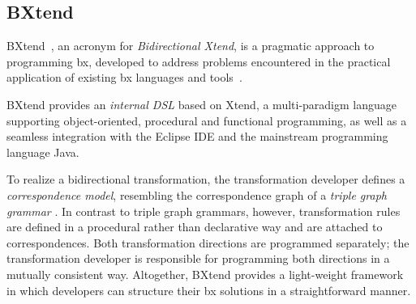\subsection{BXtend}
\label{sec:BXtend}


BXtend~\cite{MODELSWARD2018-Buchmann}, an acronym for \emph{Bidirectional Xtend}, is a pragmatic approach to programming bx, developed to address problems encountered in the practical application of existing bx languages and tools~\cite{DBLP:conf/icsoft/BuchmannG16}.

BXtend provides an \emph{internal DSL} based on Xtend, a multi-paradigm language supporting object-oriented, procedural and functional programming, as well as a seamless integration with the Eclipse IDE and the mainstream programming language Java.

To realize a bidirectional transformation, the transformation developer defines a \emph{correspondence model}, resembling the correspondence graph of a \emph{triple graph grammar} \cite{Schurr1994}.
In contrast to triple graph grammars, however, transformation rules are defined in a procedural rather than declarative way and are attached to correspondences.
Both transformation directions are programmed separately; the transformation developer is responsible for programming both directions in a mutually consistent way.
Altogether, BXtend provides a light-weight framework in which developers can structure their bx solutions in a straightforward manner.


